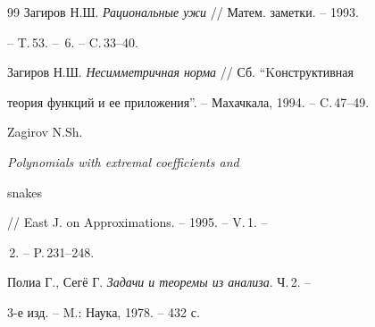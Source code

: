 \begin{thebibliography}{99}
Загиров Н.Ш. {\em Рациональные ужи} // Матем. заметки. -- 1993. 


-- T.\,53. -- \No\,6. -- C.\,33--40. 




Загиров Н.Ш. {\em Несимметричная норма} // Сб. ``Kонструктивная 


теория функций и ее приложения''. -- Махачкала, 1994. -- C.\,47--49. 




Zagirov N.Sh. {\em Polynomials with extremal coefficients and 


snakes} // East J. on Approximations. -- 1995. -- V.\,1. -- 


\No\,2. -- P.\,231--248. 




Полиа Г., Сег\"е Г. {\em Задачи и теоремы из анализа}. Ч.\,2. -- 


3-е изд. -- M.: Наука, 1978. -- 432 с. 


 


\end{thebibliography} 


 


\vskip 2cm 


 








 


\label{end} 


 


